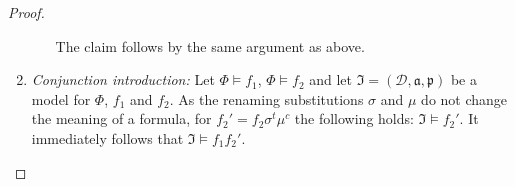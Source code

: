 \begin{proof}
\begin{enumerate}
\begin{itemize}
 The claim follows by the same 
 argument as above.
 \end{itemize}
 \item \emph{Conjunction introduction:} 
 Let $\Phi\models f_1$, $\Phi\models f_2$ and let  $\mathfrak{I}=(\mathcal{D},\mathfrak{a,p})$ be a model for $\Phi$, $f_1$ and $f_2$. 
As the renaming substitutions $\sigma$ and $\mu$ do not change the meaning of a formula, for  $f_2'= f_2\sigma^t\mu^c$ the following holds:
$\mathfrak{I}\models f_2'$. 
It immediately follows that $\mathfrak{I}\models f_1f_2'$. %

\end{enumerate}
\end{proof}
